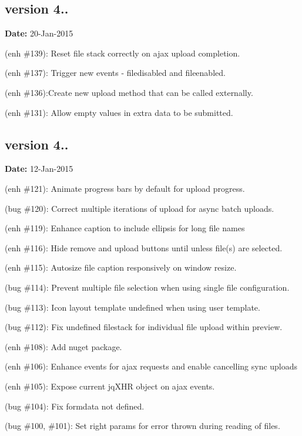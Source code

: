 \subsection*{version 4..}

{\bfseries Date\+:} 20-\/\+Jan-\/2015


\begin{DoxyItemize}
\item (enh \#139)\+: Reset file stack correctly on ajax upload completion.
\item (enh \#137)\+: Trigger new events -\/ {\ttfamily filedisabled} and {\ttfamily fileenabled}.
\item (enh \#136)\+:Create new upload method that can be called externally.
\item (enh \#131)\+: Allow empty values in extra data to be submitted.
\end{DoxyItemize}

\subsection*{version 4..}

{\bfseries Date\+:} 12-\/\+Jan-\/2015


\begin{DoxyItemize}
\item (enh \#121)\+: Animate progress bars by default for upload progress.
\item (bug \#120)\+: Correct multiple iterations of upload for async batch uploads.
\item (enh \#119)\+: Enhance caption to include ellipsis for long file names
\item (enh \#116)\+: Hide remove and upload buttons until unless file(s) are selected.
\item (enh \#115)\+: Autosize file caption responsively on window resize.
\item (bug \#114)\+: Prevent multiple file selection when using single file configuration.
\item (bug \#113)\+: Icon layout template undefined when using user template.
\item (bug \#112)\+: Fix undefined filestack for individual file upload within preview.
\item (enh \#108)\+: Add nuget package.
\item (enh \#106)\+: Enhance events for ajax requests and enable cancelling sync uploads
\item (enh \#105)\+: Expose current jq\+X\+HR object on ajax events.
\item (bug \#104)\+: Fix formdata not defined.
\item (bug \#100, \#101)\+: Set right params for error thrown during reading of files.
\end{DoxyItemize}


